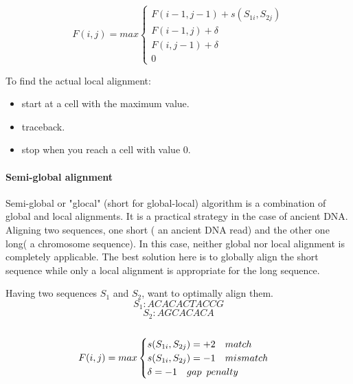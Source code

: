 \documentclass[11pt,a4paper]{report}
\begin{document}
\[ F(i,j)= max
\begin{cases}
   F(i-1,j-1) + s(S_{1i} , S_{2j})\\
   F(i-1 , j)+ \delta\\
   F(i,j-1)+ \delta\\
   0 \quad  
\end{cases}
\]

To find the actual local alignment:
\begin{itemize}
 \item start at a cell with the maximum value.
 \item traceback.
 \item stop when you reach a cell with value 0.
\end{itemize} 






\paragraph{Semi-global alignment}

Semi-global or "glocal" (short for global-local) algorithm is a combination of global
and local alignments. 
It is a practical strategy in the case of ancient DNA.
Aligning two sequences, one short ( an ancient DNA read) and the 
other one long( a chromosome sequence). In this case, neither global 
nor local alignment is completely applicable. The best solution here is to globally 
align the short sequence while only a local alignment is appropriate for the long sequence.


Having two sequences  $S_{1}$ and $S_{2}$, want to optimally align them.
$$S_{1}:ACACACTACCG$$
$$S_{2}:AGCACACA$$\\

\[ F(i,j)= max
\begin{cases}
   s(S_{1i},S_{2j})= +2 \quad match \\
   s(S_{1i},S_{2j})= -1 \quad mismatch \\
  \delta = -1  \quad gap \enskip  penalty \\ 
\end{cases}
\] \\
\end{document}
